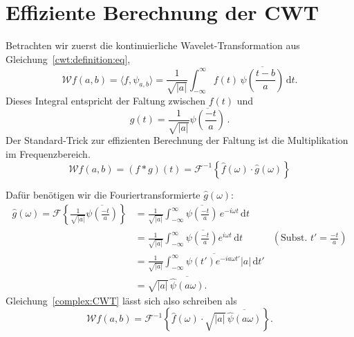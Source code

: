 \section{Effiziente Berechnung der CWT}

Betrachten wir zuerst die kontinuierliche Wavelet-Transformation aus Gleichung~\eqref{cwt:definition:eq},
\begin{equation}
\mathcal{W}f (a,b)
=
\langle f,\psi_{a,b}\rangle
=
\frac{1}{\sqrt{|a|}}\int_{-\infty}^\infty f(t)\,
	\overline{\psi\left(\frac{t-b}{a}\right)}\,\mathrm{d}t.\label{complex:CWT}
\end{equation}
Dieses Integral entspricht der Faltung zwischen $f(t)$ und 
\begin{equation} 
    g(t) 
    = \frac{1}{\sqrt{|a|}} \overline{\psi\left(\frac{-t}{a}\right)} \,.
\end{equation}
Der Standard-Trick zur effizienten Berechnung der Faltung ist die Multiplikation im Frequenzbereich.
\begin{equation} 
\mathcal{W}f (a,b) = (f*g)(t) = \mathcal{F}^{-1}\left\lbrace\hat f(\omega) \cdot \hat g (\omega) \right\rbrace
\end{equation}

Dafür benötigen wir die Fouriertransformierte $\hat g (\omega)$:
\begin{align*}
	\hat g (\omega) = 
    \mathcal{F}\left\lbrace \frac{1}{\sqrt{|a|}} \overline{\psi\left(\frac{-t}{a}\right)}\right\rbrace 
	&= \frac{1}{\sqrt{|a|}} \int_{-\infty}^{\infty}\overline{\psi\left(\frac{-t}{a}\right)}\,e^{-i\omega t}\,\mathrm{d}t\\
	&= \frac{1}{\sqrt{|a|}} \overline{\int_{-\infty}^{\infty}\psi\left(\frac{-t}{a}\right)e^{i\omega t}\,\mathrm{d}t}  
    & \left(\text{Subst. } t' = \frac{-t}{a}\right)\\
	&= \frac{1}{\sqrt{|a|}} \overline{\int_{-\infty}^{\infty}\psi\left(t'\right)e^{-ia\omega t'} |a|\,\mathrm{d}t'}\\
	&= \sqrt{|a|} \, \overline{\hat{\psi}\left(a\omega\right)}.
\end{align*}
Gleichung~\eqref{complex:CWT} lässt sich also schreiben als
\begin{equation}
\mathcal{W}f(a,b)
= \mathcal{F}^{-1}\left\lbrace\hat{f}(\omega)\cdot\! \sqrt{|a|}\, \overline{\hat{\psi}\left(a\omega\right)}\right\rbrace. \label{complex:fcwt}
\end{equation}

